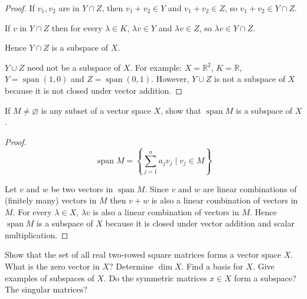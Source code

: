 \begin{proof}
    If $v_{1}, v_{2}$ are in $Y\cap Z$, then $v_{1} + v_{2}\in Y$ and $v_{1} + v_{2}\in Z$, so $v_{1} + v_{2} \in Y\cap Z$.

    If $v$ in $Y\cap Z$ then for every $\lambda\in K$, $\lambda v\in Y$ and $\lambda v\in Z$, so $\lambda v\in Y\cap Z$.

    Hence $Y\cap Z$ is a subspace of $X$.
    \bigskip

    $Y\cup Z$ need not be a subspace of $X$. For example: $X = \mathbb{R}^{2}$, $K = \mathbb{R}$, $Y = \operatorname{span} (1, 0)$ and $Z = \operatorname{span} (0, 1)$. However, $Y\cup Z$ is not a subspace of $X$ because it is not closed under vector addition.
\end{proof}

\begin{exercise}\label{chapter2:section1:exercise11}
    If $M \ne \varnothing$ is any subset of a vector space $X$, show that $\operatorname{span} M$ is a subspace of $X$.
\end{exercise}

\begin{proof}
    \[
        \operatorname{span} M = \left\{ \sum^{n}_{j=1}a_{j}v_{j} \mid v_{j} \in M \right\}
    \]

    Let $v$ and $w$ be two vectors in $\operatorname{span} M$. Since $v$ and $w$ are linear combinations of (finitely many) vectors in $M$ then $v + w$ is also a linear combination of vectors in $M$. For every $\lambda \in X$, $\lambda v$ is also a linear combination of vectors in $M$. Hence $\operatorname{span} M$ is a subspace of $X$ because it is closed under vector addition and scalar multiplication.
\end{proof}

\begin{exercise}\label{chapter2:section1:exercise12}
    Show that the set of all real two-rowed square matrices forms a vector space $X$. What is the zero vector in $X$? Determine $\dim X$. Find a basis for $X$. Give examples of subspaces of $X$. Do the symmetric matrices $x\in X$ form a subspace? The singular matrices?
\end{exercise}


